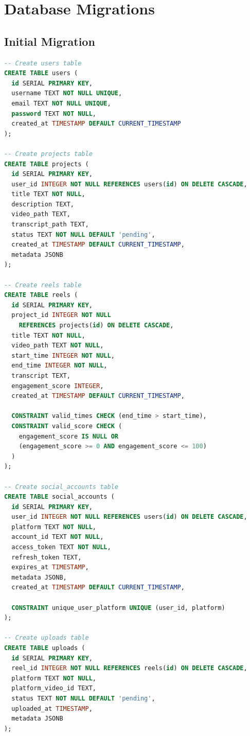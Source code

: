 \section{Database Migrations}

\subsection{Initial Migration}

\begin{lstlisting}[language=SQL, caption=migrations/0001\_initial\_schema.sql]
-- Create users table
CREATE TABLE users (
  id SERIAL PRIMARY KEY,
  username TEXT NOT NULL UNIQUE,
  email TEXT NOT NULL UNIQUE,
  password TEXT NOT NULL,
  created_at TIMESTAMP DEFAULT CURRENT_TIMESTAMP
);

-- Create projects table
CREATE TABLE projects (
  id SERIAL PRIMARY KEY,
  user_id INTEGER NOT NULL REFERENCES users(id) ON DELETE CASCADE,
  title TEXT NOT NULL,
  description TEXT,
  video_path TEXT,
  transcript_path TEXT,
  status TEXT NOT NULL DEFAULT 'pending',
  created_at TIMESTAMP DEFAULT CURRENT_TIMESTAMP,
  metadata JSONB
);

-- Create reels table
CREATE TABLE reels (
  id SERIAL PRIMARY KEY,
  project_id INTEGER NOT NULL 
    REFERENCES projects(id) ON DELETE CASCADE,
  title TEXT NOT NULL,
  video_path TEXT NOT NULL,
  start_time INTEGER NOT NULL,
  end_time INTEGER NOT NULL,
  transcript TEXT,
  engagement_score INTEGER,
  created_at TIMESTAMP DEFAULT CURRENT_TIMESTAMP,
  
  CONSTRAINT valid_times CHECK (end_time > start_time),
  CONSTRAINT valid_score CHECK (
    engagement_score IS NULL OR 
    (engagement_score >= 0 AND engagement_score <= 100)
  )
);

-- Create social_accounts table
CREATE TABLE social_accounts (
  id SERIAL PRIMARY KEY,
  user_id INTEGER NOT NULL REFERENCES users(id) ON DELETE CASCADE,
  platform TEXT NOT NULL,
  account_id TEXT NOT NULL,
  access_token TEXT NOT NULL,
  refresh_token TEXT,
  expires_at TIMESTAMP,
  metadata JSONB,
  created_at TIMESTAMP DEFAULT CURRENT_TIMESTAMP,
  
  CONSTRAINT unique_user_platform UNIQUE (user_id, platform)
);

-- Create uploads table
CREATE TABLE uploads (
  id SERIAL PRIMARY KEY,
  reel_id INTEGER NOT NULL REFERENCES reels(id) ON DELETE CASCADE,
  platform TEXT NOT NULL,
  platform_video_id TEXT,
  status TEXT NOT NULL DEFAULT 'pending',
  uploaded_at TIMESTAMP,
  metadata JSONB
);


\end{lstlisting}
